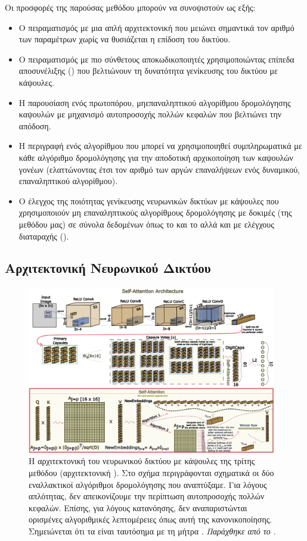 Οι προσφορές της παρούσας μεθόδου μπορούν να συνοψιστούν ως εξής:
\begin{itemize}
  \item Ο πειραματισμός με μια απλή αρχιτεκτονική που μειώνει σημαντικά τον αριθμό των παραμέτρων χωρίς να θυσιάζεται η επίδοση του δικτύου.
  \item Ο πειραματισμός με πιο σύνθετους αποκωδικοποιητές χρησιμοποιώντας επίπεδα αποσυνέλιξης () που βελτιώνουν τη δυνατότητα γενίκευσης του δικτύου με κάψουλες.
  \item Η παρουσίαση ενός πρωτοπόρου, μη\textendash επαναληπτικού αλγορίθμου δρομολόγησης καψουλών με μηχανισμό αυτο\textendash προσοχής πολλών κεφαλών που βελτιώνει την απόδοση.
  \item Η περιγραφή ενός αλγορίθμου που μπορεί να χρησιμοποιηθεί συμπληρωματικά με κάθε αλγόριθμο δρομολόγησης για την αποδοτική αρχικοποίηση των καψουλών γονέων (ελαττώνοντας έτσι τον αριθμό των αργών επαναλήψεων ενός δυναμικού, επαναληπτικού αλγορίθμου).
  \item Ο έλεγχος της ποιότητας γενίκευσης νευρωνικών δικτύων με κάψουλες που χρησιμοποιούν μη επαναληπτικούς αλγορίθμους δρομολόγησης με δοκιμές (της μεθόδου μας) σε σύνολα δεδομένων όπως το  και το  αλλά και με ελέγχους διαταραχής ().
\end{itemize}

\subsection{Αρχιτεκτονική Νευρωνικού Δικτύου}

\begin{figure}[h]
  \centering
  \includegraphics[width=0.97\textwidth]{images/chapter method/therd_method_architecture_encoder.pdf}
  \caption{Η αρχιτεκτονική του νευρωνικού δικτύου με κάψουλες της τρίτης μεθόδου (αρχιτεκτονική ). Στο σχήμα περιγράφονται σχηματικά οι δύο εναλλακτικοί αλγόριθμοι δρομολόγησης που αναπτύξαμε. Για λόγους απλότητας, δεν απεικονίζουμε την περίπτωση αυτο\textendash προσοχής πολλών κεφαλών. Επίσης, για λόγους κατανόησης, δεν αναπαριστώνται ορισμένες αλγοριθμικές λεπτομέρειες όπως αυτή της κανονικοποίησης. Σημειώνεται ότι τα  είναι ταυτόσημα με τη μήτρα . \textit{Παράχθηκε από το \href{https://inkscape.org/}{}}.}
  \label{fig:method_3_architecture}
\end{figure}

